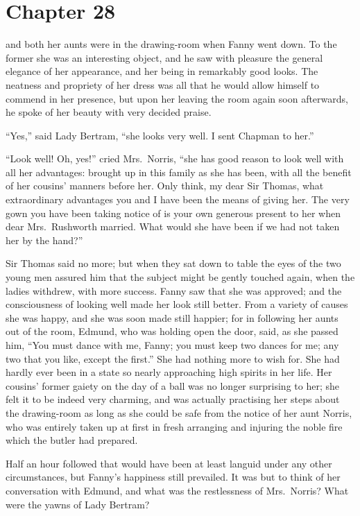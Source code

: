 \chapter{Chapter 28}

 and both her aunts were in the drawing-room
when Fanny went down.  To the former she was an interesting
object, and he saw with pleasure the general elegance
of her appearance, and her being in remarkably good looks.
The neatness and propriety of her dress was all that
he would allow himself to commend in her presence,
but upon her leaving the room again soon afterwards,
he spoke of her beauty with very decided praise.

``Yes,'' said Lady Bertram, ``she looks very well.
I sent Chapman to her.''

``Look well!  Oh, yes!'' cried Mrs.\ Norris, ``she has
good reason to look well with all her advantages:
brought up in this family as she has been, with all
the benefit of her cousins' manners before her.
Only think, my dear Sir Thomas, what extraordinary
advantages you and I have been the means of giving her.
The very gown you have been taking notice of is your own
generous present to her when dear Mrs.\ Rushworth married.
What would she have been if we had not taken her by
the hand?''

Sir Thomas said no more; but when they sat down to table
the eyes of the two young men assured him that the subject
might be gently touched again, when the ladies withdrew,
with more success.  Fanny saw that she was approved;
and the consciousness of looking well made her look
still better.  From a variety of causes she was happy,
and she was soon made still happier; for in following her
aunts out of the room, Edmund, who was holding open the door,
said, as she passed him, ``You must dance with me, Fanny;
you must keep two dances for me; any two that you like,
except the first.''  She had nothing more to wish for.
She had hardly ever been in a state so nearly approaching
high spirits in her life.  Her cousins' former gaiety
on the day of a ball was no longer surprising to her;
she felt it to be indeed very charming, and was actually
practising her steps about the drawing-room as long as she
could be safe from the notice of her aunt Norris, who was
entirely taken up at first in fresh arranging and injuring
the noble fire which the butler had prepared.

Half an hour followed that would have been at least languid
under any other circumstances, but Fanny's happiness
still prevailed.  It was but to think of her conversation
with Edmund, and what was the restlessness of Mrs.\ Norris?
What were the yawns of Lady Bertram?

